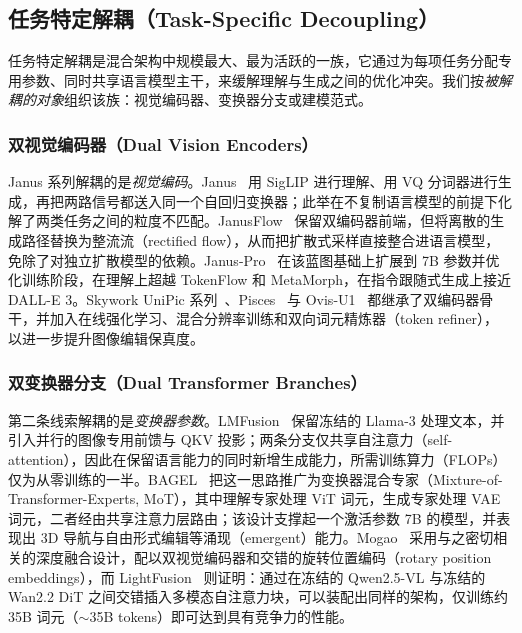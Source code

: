 \subsection{任务特定解耦（Task-Specific Decoupling）}
\label{subsec:decoupling}

任务特定解耦是混合架构中规模最大、最为活跃的一族，它通过为每项任务分配专用参数、同时共享语言模型主干，来缓解理解与生成之间的优化冲突。我们按\emph{被解耦的对象}组织该族：视觉编码器、变换器分支或建模范式。

\subsubsection{双视觉编码器（Dual Vision Encoders）}
\label{subsubsec:dual-enc}

Janus 系列解耦的是\emph{视觉编码}。Janus~\cite{DBLP:conf/cvpr/WuCWMLPLXYR025} 用 SigLIP 进行理解、用 VQ 分词器进行生成，再把两路信号都送入同一个自回归变换器；此举在不复制语言模型的前提下化解了两类任务之间的粒度不匹配。JanusFlow~\cite{DBLP:conf/cvpr/MaLCLWWPXZYZW0R25} 保留双编码器前端，但将离散的生成路径替换为整流流（rectified flow），从而把扩散式采样直接整合进语言模型，免除了对独立扩散模型的依赖。Janus-Pro~\cite{chen2025januspro} 在该蓝图基础上扩展到 7B 参数并优化训练阶段，在理解上超越 TokenFlow 和 MetaMorph，在指令跟随式生成上接近 DALL-E 3。Skywork UniPic 系列~\cite{wang2025skyworkunipic,wei2025skyworkunipic2}、Pisces~\cite{xu2025pisces} 与 Ovis-U1~\cite{wang2025ovisu1} 都继承了双编码器骨干，并加入在线强化学习、混合分辨率训练和双向词元精炼器（token refiner），以进一步提升图像编辑保真度。

\subsubsection{双变换器分支（Dual Transformer Branches）}
\label{subsubsec:dual-branch}

第二条线索解耦的是\emph{变换器参数}。LMFusion~\cite{shi2024lmfusion} 保留冻结的 Llama-3 处理文本，并引入并行的图像专用前馈与 QKV 投影；两条分支仅共享自注意力（self-attention），因此在保留语言能力的同时新增生成能力，所需训练算力（FLOPs）仅为从零训练的一半。BAGEL~\cite{deng2025bagel} 把这一思路推广为变换器混合专家（Mixture-of-Transformer-Experts, MoT），其中理解专家处理 ViT 词元，生成专家处理 VAE 词元，二者经由共享注意力层路由；该设计支撑起一个激活参数 7B 的模型，并表现出 3D 导航与自由形式编辑等涌现（emergent）能力。Mogao~\cite{liao2025mogao} 采用与之密切相关的深度融合设计，配以双视觉编码器和交错的旋转位置编码（rotary position embeddings），而 LightFusion~\cite{wang2025lightfusion} 则证明：通过在冻结的 Qwen2.5-VL 与冻结的 Wan2.2 DiT 之间交错插入多模态自注意力块，可以装配出同样的架构，仅训练约 35B 词元（$\sim$35B tokens）即可达到具有竞争力的性能。

